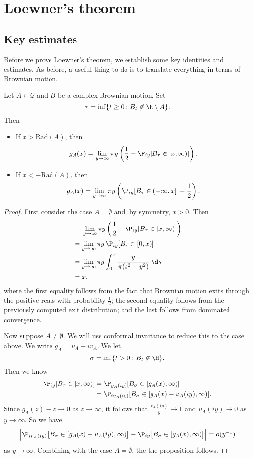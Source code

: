\documentclass[a4paper]{article}
\newcommand\rad{\mathrm{Rad}}
\begin{document}
\section{Loewner's theorem}
\subsection{Key estimates}
Before we prove Loewner's theorem, we establish some key identities and estimates. As before, a useful thing to do is to translate everything in terms of Brownian motion.
\begin{prop}
  Let $A \in \mathcal{Q}$ and $B$ be a complex Brownian motion. Set
  \[
    \tau = \inf \{t \geq 0: B_t \not \in \H \setminus A\}.
  \]
  Then
  \begin{itemize}
    \item If $x > \rad(A)$, then
      \[
        g_A(x) = \lim_{y \to \infty} \pi y \left(\frac{1}{2} - \P_{iy} [B_\tau \in [x, \infty)]\right).
      \]
    \item If $x < -\rad(A)$, then
      \[
        g_A(x) = \lim_{y \to \infty} \pi y \left(\P_{iy}[B_\tau \in (-\infty, x]] - \frac{1}{2}\right).
      \]
  \end{itemize}
\end{prop}

\begin{proof}
  First consider the case $A = \emptyset$ and, by symmetry, $x > 0$. Then
  \begin{align*}
    &\hphantom{{}={}}\lim_{y \to \infty} \pi y \left(\frac{1}{2} - \P_{iy}[B_\tau \in [x, \infty)]\right)\\
    &= \lim_{y \to \infty} \pi y \,\P_{iy} [B_\tau \in [0, x)]\\
    &=\lim_{y \to \infty} \pi y \int_0^x \frac{y}{\pi (s^2 + y^2)}\;\d s\\
    &= x,
  \end{align*}
  where the first equality follows from the fact that Brownian motion exits through the positive reals with probability $\frac{1}{2}$; the second equality follows from the previously computed exit distribution; and the last follows from dominated convergence.

  Now suppose $A \not= \emptyset$. We will use conformal invariance to reduce this to the case above. We write $g_A = u_A + i v_A$. We let
  \[
    \sigma = \inf \{t > 0: B_t \not \in \H\}.
  \]
  Then we know
  \begin{align*}
    \P_{iy} [B_\tau \in [x, \infty)] &= \P_{g_A(iy)} [B_\sigma \in [g_A(x), \infty)]\\
    &= \P_{iv_A(iy)} [B_\sigma \in [g_A(x) - u_A(iy), \infty)].
  \end{align*}
  Since $g_A(z) - z \to 0$ as $z \to \infty$, it follows that $\frac{v_A(iy)}{y} \to 1$ and $u_A(iy) \to 0$ as $y \to \infty$. So we have
  \[
    \Big|\P_{iv_A(iy)} \big[B_\sigma \in [g_A(x) - u_A(iy), \infty)\big] - \P_{iy}\big[B_\sigma \in [g_A(x), \infty)\big]\Big| = o(y^{-1})
  \]
  as $y \to \infty$. Combining with the case $A = \emptyset$, the the proposition follows.
\end{proof}
\end{document}
